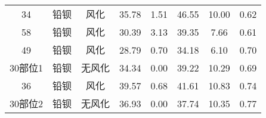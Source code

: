 \documentclass[withoutpreface,bwprint]{cumcmthesis} %
\begin{document}
\begin{appendices}
\begin{table}[!h]
\begin{tabular}{@{}cccccccc@{}}
		34                                                        & 铅钡          & 风化                                                       & 35.78                                                          & 1.51                                                         & 46.55                                                        & 10.00                                                        & 0.62                                                            \\
		58                                                        & 铅钡          & 风化                                                       & 30.39                                                          & 3.13                                                         & 39.35                                                        & 7.66                                                         & 0.61                                                            \\
		49                                                        & 铅钡          & 风化                                                       & 28.79                                                          & 0.70                                                         & 34.18                                                        & 6.10                                                         & 0.70                                                            \\
		30部位1                                                     & 铅钡          & 无风化                                                      & 34.34                                                          & 0.00                                                         & 39.22                                                        & 10.29                                                        & 0.69                                                            \\
		36                                                        & 铅钡          & 风化                                                       & 39.57                                                          & 0.68                                                         & 41.61                                                        & 10.83                                                        & 0.74                                                            \\
		30部位2                                                     & 铅钡          & 无风化                                                      & 36.93                                                          & 0.00                                                         & 37.74                                                        & 10.35                                                        & 0.77                                                            \\

\end{tabular}
\end{table}
\end{appendices}
\end{document}
